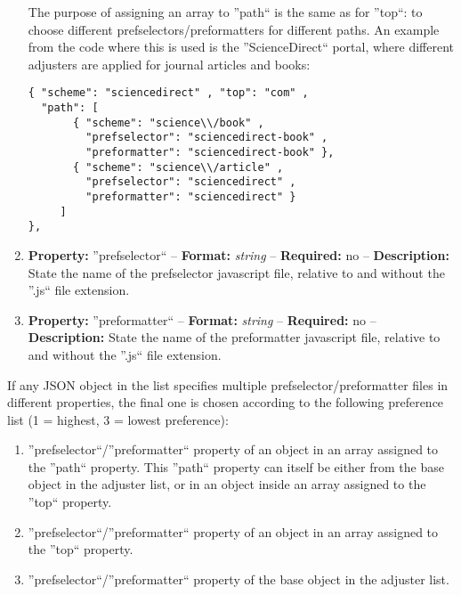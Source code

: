 \documentclass[
a4paper,
12pt,
]
{article}
\begin{document}
\begin{enumerate}
  The purpose of assigning an array to ''path`` is the same as for ''top``: to choose different prefselectors/preformatters for different paths. An example from the code where this is used is the ''ScienceDirect`` portal, where different adjusters are applied for journal articles and books:
  \begin{center}
  \begin{lstlisting}
{ "scheme": "sciencedirect" , "top": "com" ,
  "path": [
	   { "scheme": "science\\/book" , 
	     "prefselector": "sciencedirect-book" , 
	     "preformatter": "sciencedirect-book" },
	   { "scheme": "science\\/article" , 
	     "prefselector": "sciencedirect" , 
	     "preformatter": "sciencedirect" }
	 ]			
},
\end{lstlisting}
\end{center}

\item \textbf{Property:} ''prefselector`` -- \textbf{Format:} \textit{string} -- \textbf{Required:} no -- \textbf{Description:} State the name of the prefselector javascript file, relative to
and without the ''.js`` file extension.

\item \textbf{Property:} ''preformatter`` -- \textbf{Format:} \textit{string} -- \textbf{Required:} no -- \textbf{Description:} State the name of the preformatter javascript file, relative to
and without the ''.js`` file extension.
 \end{enumerate}

 If any JSON object in the list specifies multiple prefselector/preformatter files in different properties, the final one is chosen according to the following preference list (1 = highest, 3 = lowest preference):
 \begin{enumerate}
  \item ''prefselector``/''preformatter`` property of an object in an array assigned to the ''path`` property. This ''path`` property can itself be either from the base object in the adjuster list, or in an object inside an array assigned to the ''top`` property.
  
  \item ''prefselector``/''preformatter`` property of an object in an array assigned to the ''top`` property.
  
  \item ''prefselector``/''preformatter`` property of the base object in the adjuster list.
 \end{enumerate}
 
\end{document}
